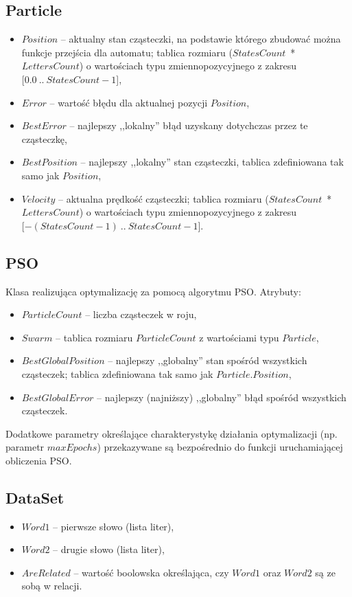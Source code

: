 \documentclass{../llncs_template/llncs}
\begin{document}
\subsection*{Particle}
\begin{itemize}
\item $Position$ -- aktualny stan cząsteczki, na podstawie którego zbudować można funkcje przejścia dla automatu; tablica rozmiaru  ($StatesCount$\ *\ $LettersCount$) o wartościach typu zmiennopozycyjnego z zakresu $[0.0\ ..\ StatesCount - 1$],
\item $Error$ -- wartość błędu dla aktualnej pozycji $Position$,
\item $BestError$ -- najlepszy ,,lokalny'' błąd uzyskany dotychczas przez te cząsteczkę,
\item $BestPosition$ -- najlepszy ,,lokalny'' stan cząsteczki, tablica zdefiniowana tak samo jak $Position$,
\item $Velocity$ -- aktualna prędkość cząsteczki; tablica rozmiaru ($StatesCount$\ *\ $LettersCount$) o wartościach typu zmiennopozycyjnego z zakresu $[-(StatesCount - 1)\ ..\ StatesCount - 1$].
\end{itemize}

\subsection*{PSO}
Klasa realizująca optymalizację za pomocą algorytmu PSO. Atrybuty:
\begin{itemize}
\item $ParticleCount$ -- liczba cząsteczek w roju,
\item $Swarm$ -- tablica rozmiaru $ParticleCount$ z wartościami typu $Particle$,
\item $BestGlobalPosition$ -- najlepszy ,,globalny'' stan spośród wszystkich cząsteczek; tablica  zdefiniowana tak samo jak $Particle.Position$,
\item $BestGlobalError$ -- najlepszy (najniższy) ,,globalny'' błąd spośród wszystkich cząsteczek.
\end{itemize}
Dodatkowe parametry określające charakterystykę działania optymalizacji (np. parametr $maxEpochs$) przekazywane są bezpośrednio do funkcji uruchamiającej obliczenia PSO.

\subsection*{DataSet}
\begin{itemize}
\item $Word1$ -- pierwsze słowo (lista liter),
\item $Word2$ -- drugie słowo (lista liter),
\item $AreRelated$ -- wartość boolowska określająca, czy $Word1$ oraz $Word2$ są ze sobą w relacji.
\end{itemize}
\end{document}
